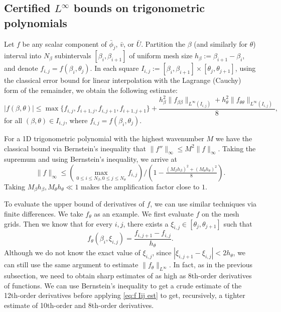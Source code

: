 \documentclass[11pt,a4paper]{article}
\numberwithin{equation}{section}
\newcommand{\assign}{:=}
\begin{document}
\subsection{Certified $L^{\infty}$ bounds on trigonometric
polynomials}\label{subsec:Linf-envelope}

Let $f$ be any scalar component of $\bar{\phi}_j$, $\bar{v}$, or $\bar{U}$.
Partition the $\beta$ (and similarly for $\theta$) interval into $N_{\beta}$
subintervals $[\beta_i, \beta_{i + 1}]$ of uniform mesh size $h_{\beta}
\assign \beta_{i + 1} - \beta_i$, and denote $f_{i, j} = f (\beta_i,
\theta_j)$. In each square $I_{i, j} \assign [\beta_i, \beta_{i + 1}] \times
[\theta_j, \theta_{j + 1}]$, using the classical error bound for linear
interpolation with the Lagrange (Cauchy) form of the remainder, we obtain the following estimate:
\begin{equation}
  |f (\beta, \theta) | \leqslant \max \{f_{i, j}, f_{i + 1, j}, f_{i, j + 1},
  f_{i + 1, j + 1} \} + \frac{h_{\beta}^2 \|f_{\beta \beta} \|_{L^{\infty}
  (I_{i, j})} + h_{\theta}^2 \|f_{\theta \theta} \|_{L^{\infty} (I_{i,
  j})}}{8}, \label{eq:f Iij est}
\end{equation}
for all $(\beta, \theta) \in I_{i, j}$, where $f_{i, j} = f (\beta_i,
\theta_j)$.

For a 1D trigonometric polynomial with the highest wavenumber $M$ we have the
classical bound via Bernstein's inequality that $\|f'' \|_{\infty} \leqslant M^2 \|f\|_{\infty}$. Taking the supremum and using Bernstein's inequality, we arrive at
\begin{equation}
  \|f\|_{\infty} \leqslant (\max_{0 \leqslant i \leqslant N_{\beta}, 0
  \leqslant j \leqslant N_{\theta}} f_{i, j}) / \left( 1 - \tfrac{(M_{\beta}
  h_{\beta})^2 + (M_{\theta} h_{\theta})^2}{8} \right) .
  \label{eq:linf-envelope}
\end{equation}
Taking $M_{\beta} h_{\beta}, M_{\theta} h_{\theta} \ll 1$ makes the
amplification factor close to $1$.

To evaluate the upper bound of derivatives of $f$, we can use similar
techniques via finite differences. We take $f_{\theta}$ as an example. We first evaluate $f$ on the
mesh grids. Then we know that for every $i, j$, there exists a $\xi_{i, j} \in
[\theta_j, \theta_{j + 1}]$ such that
\[ f_{\theta} (\beta_i, \xi_{i, j}) = \frac{f_{i, j + 1} - f_{i,
   j}}{h_{\theta}} . \]
Although we do not know the exact value of $\xi_{i, j}$, since $| \xi_{i, j +
1} - \xi_{i, j} | < 2 h_{\theta}$, we can still use the same argument to
estimate $\| f_{\theta} \|_{L^{\infty}}$. In fact, as in the previous subsection, we need to obtain sharp estimates of as high as 8th-order derivatives of functions. We can use Bernstein's inequality to get a crude estimate of the 12th-order derivatives before applying \eqref{eq:f Iij est} to get, recursively, a tighter estimate of 10th-order and 8th-order derivatives.
\end{document}
